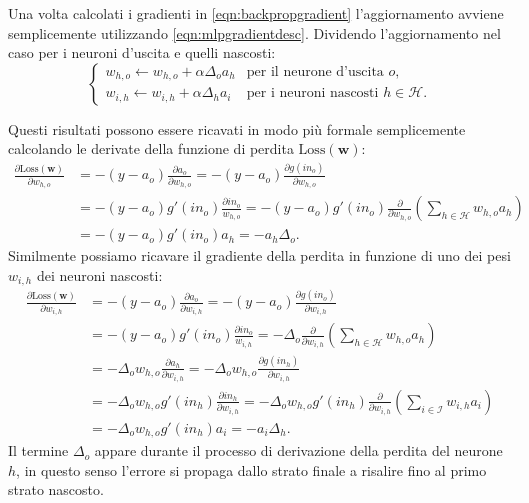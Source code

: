 \documentclass[../../main.tex]{subfiles}
\begin{document}
Una volta calcolati i gradienti in \eqref{eqn:backpropgradient} l'aggiornamento avviene semplicemente utilizzando \eqref{eqn:mlpgradientdesc}. Dividendo l'aggiornamento nel caso per i neuroni d'uscita e quelli nascosti:
\begin{equation}
    \begin{cases}
        w_{h,o} \leftarrow w_{h,o} + \alpha \Delta_o a_h & \text{per il neurone d'uscita } o,\\
        w_{i,h} \leftarrow w_{i,h} + \alpha \Delta_h a_i & \text{per i neuroni nascosti } h \in \mathcal{H}.
    \end{cases}
\end{equation}

Questi risultati possono essere ricavati in modo più formale semplicemente calcolando le derivate della funzione di perdita $\mathrm{Loss}(\mathbf{w})$:
\begin{equation}
    \begin{aligned}
        \frac{\partial \mathrm{Loss}(\boldsymbol{w})}{\partial w_{h,o}} &= -(y - a_o) \frac{\partial a_o}{\partial w_{h,o}} = -(y - a_o) \frac{\partial g(in_o)}{\partial w_{h,o}}\\
        & = -(y - a_o)g'(in_o)\frac{\partial in_o}{w_{h,o}} = -(y - a_o)g'(in_o) \frac{\partial}{\partial w_{h,o}}\left(\sum_{h \in \mathcal{H}} w_{h,o} a_h \right)\\
        & = -(y - a_o)g'(in_o) a_h = -a_h \Delta_o.        
    \end{aligned}
\end{equation}
Similmente possiamo ricavare il gradiente della perdita in funzione di uno dei pesi $w_{i,h}$ dei neuroni nascosti:
\begin{equation}
    \begin{aligned}
        \frac{\partial \mathrm{Loss}(\boldsymbol{w})}{\partial w_{i,h}} &= -(y - a_o) \frac{\partial a_o}{\partial w_{i,h}} = -(y - a_o) \frac{\partial g(in_o)}{\partial w_{i,h}}\\
        &= -(y - a_o)g'(in_o)\frac{\partial in_o}{w_{i,h}} = -\Delta_o \frac{\partial}{\partial w_{i,h}}\left(\sum_{h \in \mathcal{H}} w_{h,o} a_h \right) \\
        &= -\Delta_o w_{h,o} \frac{\partial a_h}{\partial w_{i,h}} = -\Delta_o w_{h,o} \frac{\partial g(in_h)}{\partial w_{i,h}} \\
        &= - \Delta_o w_{h,o} g'(in_h) \frac{\partial in_h}{\partial w_{i,h}} = -\Delta_o w_{h,o} g'(in_h) \frac{\partial}{\partial w_{i,h}} \left(\sum_{i \in \mathcal{I}} w_{i,h} a_i\right)\\
        &= -\Delta_o w_{h,o} g'(in_h) a_i = -a_i \Delta_h.
    \end{aligned}
\end{equation}
Il termine $\Delta_o$ appare durante il processo di derivazione della perdita  del neurone $h$, in questo senso l'errore si propaga dallo strato finale a risalire fino al primo strato nascosto.
\end{document}
